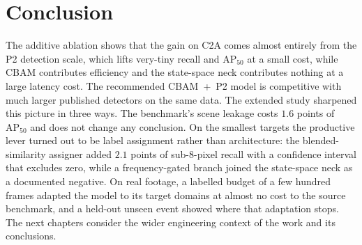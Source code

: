 \section{Conclusion}
The additive ablation shows that the gain on C2A comes almost entirely from the P2
detection scale, which lifts very-tiny recall and $\mathrm{AP}_{50}$ at a small
cost, while CBAM contributes efficiency and the state-space neck contributes
nothing at a large latency cost. The recommended CBAM~+~P2 model is competitive with
much larger published detectors on the same data. The extended study sharpened
this picture in three ways. The benchmark's scene leakage costs $1.6$ points of
$\mathrm{AP}_{50}$ and does not change any conclusion. On the smallest targets
the productive lever turned out to be label assignment rather than architecture:
the blended-similarity assigner added $2.1$ points of sub-8-pixel recall with a
confidence interval that excludes zero, while a frequency-gated branch joined
the state-space neck as a documented negative. On real footage, a labelled
budget of a few hundred frames adapted the model to its target domains at
almost no cost to the source benchmark, and a held-out unseen event showed
where that adaptation stops. The next chapters consider the wider engineering
context of the work and its conclusions.
